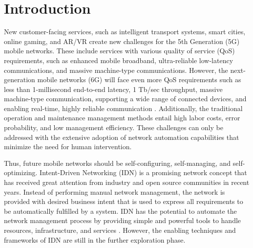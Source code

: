 

\usepackage{xcolor} 
\usepackage{listings}





\tableofcontents

\clearpage
{}

\section{Introduction}
\label{sec:Introduction}

New customer-facing services, such as intelligent transport systems, smart cities, online gaming, and AR/VR create new challenges for the 5th Generation (5G) mobile networks. These include services with various quality of service (QoS) requirements, such as enhanced mobile broadband, ultra-reliable low-latency communications, and massive machine-type communications. However, the next-generation mobile networks (6G) will face even more QoS requirements such as less than 1-millisecond end-to-end latency, 1 Tb/sec throughput,  massive machine-type communication, supporting a wide range of connected devices, and enabling real-time, highly reliable communication \cite{Han2021, Docomo2020}. Additionally, the traditional operation and maintenance management methods entail high labor costs, error probability, and low management efficiency. These challenges can only be addressed with the extensive adoption of network automation capabilities that minimize the need for human intervention. 

Thus, future mobile networks should be self-configuring, self-managing, and self-optimizing. Intent-Driven Networking (IDN) is a promising network concept that has received great attention from industry and open source communities in recent years. Instead of performing manual network management, the network is provided with desired business intent that is used to express all requirements to be automatically fulfilled by a system. IDN has the potential to automate the network management process by providing simple and powerful tools to handle resources, infrastructure, and services \cite{Mwanje2021}. However, the enabling techniques and frameworks of IDN are still in the further exploration phase.

